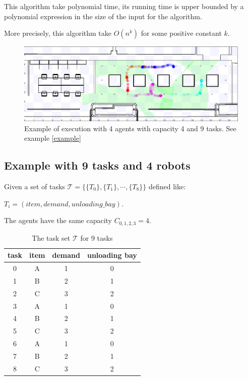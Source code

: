 This algorithm take polynomial time, its running time is upper bounded by a polynomial expression
in the size of the input for the algorithm.

More precisely, this algorithm take $O(n^k)$ for some positive constant $k$. 

\begin{figure} [hbt]
  \centering
  \includegraphics[width=\textwidth]{img/cf.png}
  \caption{Example of execution \gsp with 4 agents with capacity 4 and 9 tasks. See example \ref{example}}
  \label{fig:srst}
\end{figure}


\newpage
\subsection*{Example with 9 tasks and 4 robots} \label{example}
Given a set of tasks $\mathcal{T}= \{  \{T_0\}, \{T_1\}, \cdots, \{T_8\} \}$ defined like:

${T_i=(item, demand, unloading\_bay)}$.

The agents have the same capacity $C_{0,1,2,3} = 4$.
\begin{table}[hbt]
\begin{center}
  \begin{tabular}{|c|c|c|c|} \hline
    \textbf{task} & \textbf{item} & \textbf{demand} & \textbf{unloading bay} \\ \hline
    0    & A    & 1      & 0             \\
    1    & B    & 2      & 1             \\
    2    & C    & 3      & 2             \\
    3    & A    & 1      & 0             \\
    4    & B    & 2      & 1             \\
    5    & C    & 3      & 2             \\
    6    & A    & 1      & 0             \\
    7    & B    & 2      & 1             \\
    8    & C    & 3      & 2             \\ \hline       
  \end{tabular}
  \caption{The task set $\mathcal{T}$ for 9 tasks}
  \label{tab:t4} 
\end{center}
\end{table}

